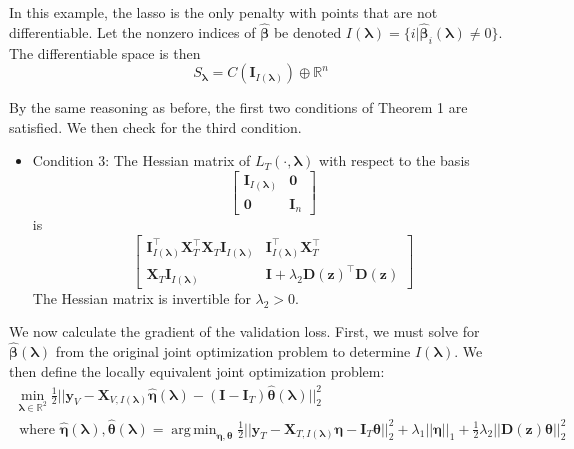 \documentclass[10pt,letterpaper]{article}
\DeclareMathOperator*{\argmin}{arg\,min}
\begin{document}
In this example, the lasso is the only penalty with points that are not differentiable. Let the nonzero indices of $\hat{\boldsymbol{\beta}}$ be denoted $I(\boldsymbol\lambda) = \{i | \hat{\boldsymbol{\beta}}_i(\boldsymbol\lambda) \ne 0\}$. The differentiable space is then
\begin{equation}
S_{\boldsymbol{\lambda}} = C(\boldsymbol I_{I(\boldsymbol\lambda)}) \oplus \mathbb{R}^n
\end{equation}

By the same reasoning as before, the first two conditions of Theorem 1 are satisfied. We then check for the third condition.
\begin{itemize}
\item[] Condition 3: The Hessian matrix of $L_T(\cdot, \boldsymbol{\lambda})$ with respect to the basis 
\begin{equation}
\begin{bmatrix}
\boldsymbol I_{I(\boldsymbol\lambda)} & \boldsymbol 0\\
\boldsymbol 0 & \boldsymbol I_n
\end{bmatrix}
\end{equation}
is
\begin{equation}
\begin{bmatrix}
\boldsymbol I_{I(\boldsymbol \lambda)}^\top \boldsymbol X_T^\top \boldsymbol X_T \boldsymbol I_{I(\boldsymbol \lambda)} &  \boldsymbol I_{I(\boldsymbol \lambda)}^\top \boldsymbol X_T^\top \\
\boldsymbol X_T \boldsymbol I_{I(\boldsymbol \lambda)} & \boldsymbol{I}
+ \lambda_2 \boldsymbol{D}(\boldsymbol{z})^\top \boldsymbol{D}(\boldsymbol{z})
\end{bmatrix}
\end{equation}
The Hessian matrix is invertible for $\lambda_2 > 0$.
\end{itemize}

We now calculate the gradient of the validation loss. First, we must solve for $\hat{\boldsymbol{\beta}}(\boldsymbol{\lambda})$ from the original joint optimization problem to determine $I(\boldsymbol \lambda)$. We then define the locally equivalent joint optimization problem:
\begin{equation}
\begin{array}{c}
\min_{\boldsymbol\lambda \in \mathbb{R}^2} \frac{1}{2}
\bigl\lvert\bigl\lvert
\boldsymbol{y}_V
- \boldsymbol{X}_{V, I(\boldsymbol \lambda)} \hat{\boldsymbol{\eta}}(\boldsymbol{\lambda})
- (\boldsymbol{I} - \boldsymbol{I}_T) \hat{\boldsymbol{\theta}}(\boldsymbol{\lambda})
\bigl\rvert\bigl\rvert^2_2 \\
\text{ where }
\hat{\boldsymbol{\eta}}(\boldsymbol{\lambda}),
\hat{\boldsymbol{\theta}}(\boldsymbol{\lambda}) =
\argmin_{\boldsymbol \eta, \boldsymbol{\theta}}
\frac{1}{2} \bigl\lvert\bigl\lvert
\boldsymbol{y}_T
- \boldsymbol{X}_{T, I(\boldsymbol \lambda)}\boldsymbol{\eta}
- \boldsymbol{I}_T \boldsymbol{\theta} \bigl\rvert\bigl\rvert^2_2
+ \lambda_1 \lvert\lvert \boldsymbol{\eta} \rvert \rvert_1
+ \frac{1}{2} \lambda_2 \lvert\lvert \boldsymbol{D}(\boldsymbol{z}) \boldsymbol{\theta} \rvert \rvert_2^2
\end{array}
\label{aplmRestricted}
\end{equation}
\end{document}
